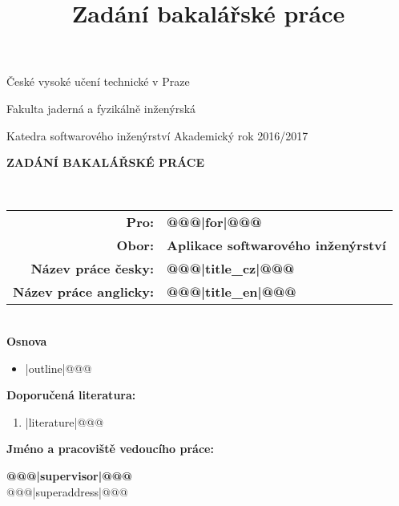 \documentclass[a4paper,11pt,twoside,final]{article}
\title{Zadání bakalářské práce}
\begin{document}
\begin{titlepage}

\begin{center}
  \begin{huge}
		České vysoké učení technické v Praze\par
		Fakulta jaderná a fyzikálně inženýrská
  \end{huge}
\end{center}

\vspace{5mm}
Katedra softwarového inženýrství \hfill     Akademický rok 2016/2017\\[2cm]

\begin{center}
  \begin{huge}
    \textbf{ZADÁNÍ BAKALÁŘSKÉ PRÁCE}
  \end{huge}
\\[2cm]
\end{center}


\begin{tabularx}{\textwidth}{rl}
\textbf{Pro:} & \textbf{@@@|for|@@@}\\[0.3cm]
\textbf{Obor:} & \textbf{Aplikace softwarového inženýrství}\\[0.3cm]
\textbf{Název práce česky:} & \textbf{@@@|title_cz|@@@}\\[0.3cm]
\textbf{Název práce anglicky:} & \textbf{@@@|title_en|@@@}
\end{tabularx}
\\[4cm]

\textbf{Osnova}

\vspace{5pt}
\begin{itemize}
@@@\item |outline|@@@
\end{itemize}

\newpage
\pagestyle{empty}

\textbf{Doporučená literatura:}

\leftmargini=13pt
\begin{enumerate}
@@@\item |literature|@@@
\end{enumerate}

\vfill
\textbf{Jméno a pracoviště vedoucího práce:}

\textbf{@@@|supervisor|@@@} \\
@@@|superaddress|@@@ \\
\par
\hfill
\begin{minipage}{0.3\textwidth}


\end{minipage}
\end{titlepage}
\end{document}
